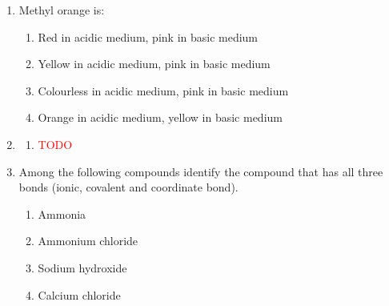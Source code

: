 \begin{enumerate}[label=(\roman*)]
    \item Methyl orange is:

        \begin{enumerate}[label=(\alph*)]
            \setlength\itemsep{0em}
            \item Red in acidic medium, pink in basic medium
            \item Yellow in acidic medium, pink in basic medium
            \item Colourless in acidic medium, pink in basic medium
            \item Orange in acidic medium, yellow in basic medium
        \end{enumerate}

    \item 

        \begin{multicols}{2}
        \begin{enumerate}[label=(\alph*)]
            \setlength\itemsep{0em}
            \item \textcolor{red}{TODO} 
        \end{enumerate}
        \end{multicols}

    \item Among the following compounds identify the compound that has all 
        three bonds (ionic, covalent and coordinate bond).

        \begin{multicols}{2}
        \begin{enumerate}[label=(\alph*)]
            \setlength\itemsep{0em}
            \item Ammonia
            \item Ammonium chloride
            \item Sodium hydroxide
            \item Calcium chloride
        \end{enumerate}
        \end{multicols}
\end{enumerate}

